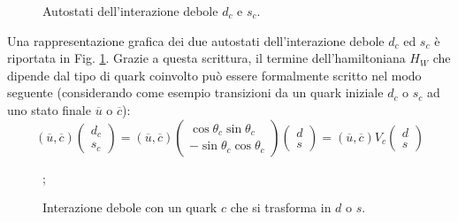 \documentclass{subnucbo}
\begin{document}
\begin{figure}[t]
        \centering
        \caption{Autostati dell'interazione debole $d_{c}$ e $s_{c}$.}
        \label{fig:sdmixing}
\end{figure}
Una rappresentazione grafica dei due autostati dell'interazione debole $d_{c}$ ed $s_{c}$ è riportata in Fig. \ref{fig:sdmixing}. Grazie a questa scrittura, il termine dell'hamiltoniana $H_{W}$ che dipende dal tipo di quark coinvolto può essere formalmente scritto nel modo seguente (considerando come esempio transizioni da un quark iniziale $d_{c}$ o $s_{c}$ ad uno stato finale $\overline{u}$ o $\overline{c}$):
\begin{equation}
        ( \overline { u } , \overline { c } ) \left( \begin{array} { c } { d _ { c } } \\ { s _ { c } } \end{array} \right) = ( \overline { u } , \overline { c } ) \left( \begin{array} { c } { \operatorname { c o s } \theta _ { c } \operatorname { s i n } \theta _ { c } } \\ { - \operatorname { s i n } \theta _ { c } \operatorname { c o s } \theta _ { c } } \end{array} \right) \left( \begin{array} { l } { d } \\ { s } \end{array} \right) = ( \overline { u } , \overline { c } ) V _ { c } \left( \begin{array} { l } { d } \\ { s } \end{array} \right)
\end{equation}

\begin{figure}[!h]
        \centering
        ;
        \caption{Interazione debole con un quark $c$ che si trasforma in $d$ o $s$.}
        \label{fig:gim_decay}
\end{figure}
\end{document}
